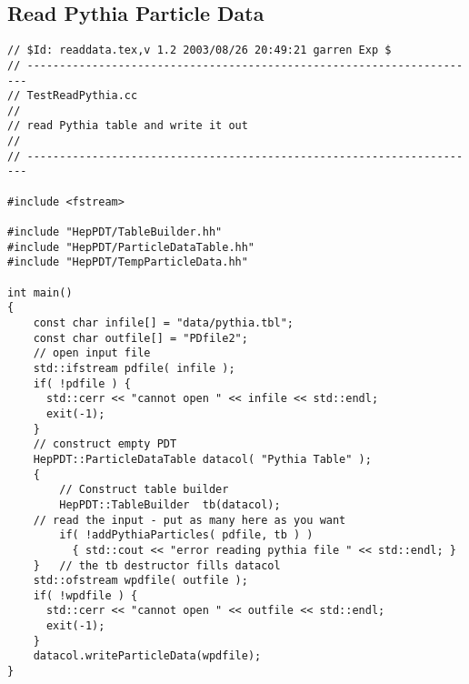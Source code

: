 \subsection { Read Pythia Particle Data }
\begin{verbatim}
// $Id: readdata.tex,v 1.2 2003/08/26 20:49:21 garren Exp $
// ----------------------------------------------------------------------
// TestReadPythia.cc
//
// read Pythia table and write it out
//
// ----------------------------------------------------------------------

#include <fstream>

#include "HepPDT/TableBuilder.hh"
#include "HepPDT/ParticleDataTable.hh"
#include "HepPDT/TempParticleData.hh"

int main()
{
    const char infile[] = "data/pythia.tbl";
    const char outfile[] = "PDfile2";
    // open input file
    std::ifstream pdfile( infile );
    if( !pdfile ) { 
      std::cerr << "cannot open " << infile << std::endl;
      exit(-1);
    }
    // construct empty PDT
    HepPDT::ParticleDataTable datacol( "Pythia Table" );
    {
        // Construct table builder
        HepPDT::TableBuilder  tb(datacol);
	// read the input - put as many here as you want
        if( !addPythiaParticles( pdfile, tb ) ) 
	      { std::cout << "error reading pythia file " << std::endl; }
    }	// the tb destructor fills datacol
    std::ofstream wpdfile( outfile );
    if( !wpdfile ) { 
      std::cerr << "cannot open " << outfile << std::endl;
      exit(-1);
    }
    datacol.writeParticleData(wpdfile);
}
\end{verbatim}

